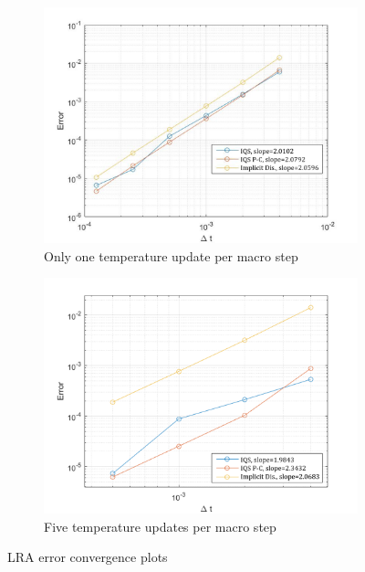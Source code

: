 \documentclass{elsarticle}
\begin{document}
\begin{figure}[!htbp]
\centering
\begin{subfigure}[!htbp]{0.49\textwidth}
\includegraphics[width=\textwidth]{figures/lra_bad.png}
\caption{Only one temperature update per macro step}
\label{fig:lra_bad}
\end{subfigure}
\begin{subfigure}[!htbp]{0.49\textwidth}
\includegraphics[width=\textwidth]{figures/lra_mp_convergence.png}
\caption{Five temperature updates per macro step}
\label{fig:lra_mpconv}
\end{subfigure}
\caption{LRA error convergence plots}
\end{figure}
\end{document}
